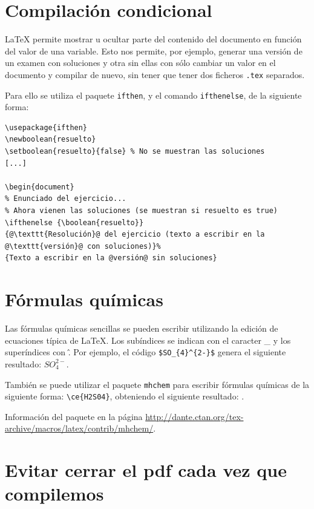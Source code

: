 \documentclass[12pt,a4paper, oneside]{report}
\begin{document}
\section{Compilación condicional}

\LaTeX{} permite mostrar u ocultar parte del contenido del documento en función del valor de una variable. Esto nos permite, por ejemplo, generar una versión de un examen con soluciones y otra sin ellas con sólo cambiar un valor en el documento y compilar de nuevo, sin tener que tener dos ficheros \texttt{.tex} separados.

Para ello se utiliza el paquete \texttt{ifthen},  y el comando \verb+ifthenelse+, de la siguiente forma:

\begin{lstlisting}
\usepackage{ifthen}
\newboolean{resuelto}
\setboolean{resuelto}{false} % No se muestran las soluciones
[...]

\begin{document}
% Enunciado del ejercicio...
% Ahora vienen las soluciones (se muestran si resuelto es true)
\ifthenelse {\boolean{resuelto}}
{@\texttt{Resolución}@ del ejercicio (texto a escribir en la @\texttt{versión}@ con soluciones)}%
{Texto a escribir en la @versión@ sin soluciones}
\end{lstlisting}
 

\section{Fórmulas químicas}

Las fórmulas químicas sencillas se pueden escribir utilizando la edición de ecuaciones típica de LaTeX. Los subíndices se indican con el caracter \_ y los superíndices con \^. Por ejemplo, el código \verb+$SO_{4}^{2-}$+ genera el siguiente resultado: $SO_{4}^{2-}$.

También se puede utilizar el paquete \texttt{mhchem} para escribir fórmulas químicas de la siguiente forma: \verb+\ce{H2S04}+, obteniendo el siguiente resultado: . 

Información del paquete en la página \url{http://dante.ctan.org/tex-archive/macros/latex/contrib/mhchem/}.



\section{Evitar cerrar el pdf cada vez que compilemos}
\end{document}
